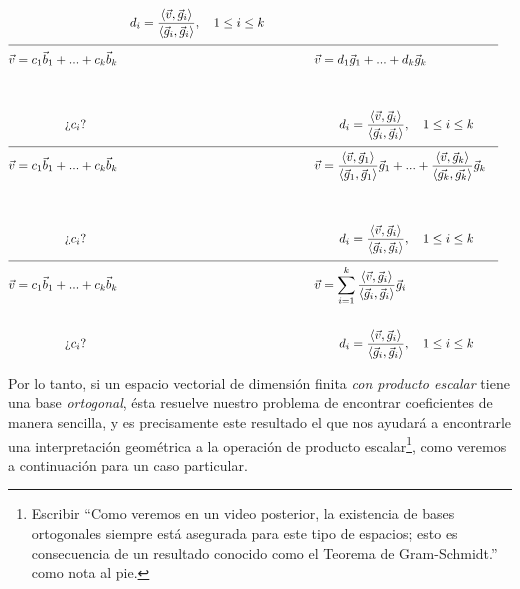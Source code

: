 \documentclass[12pt,dvipsnames]{article}
\numberwithin{equation}{section}
\begin{document}
\begin{align*}
    & &d_i = \frac{\langle \vec{v} ,\vec{g}_i \rangle}{\langle\vec{g}_i, \vec{g}_i\rangle}, \quad 1\le i\le k
    \\
    \cline{1-8}
    \vec{v}&= c_1\vec{b}_1 + ... + c_k\vec{b}_k& &\quad \quad \quad \quad \vec{v}= d_1\vec{g}_1 + ... + d_k\vec{g}_k& & & \\
    \\
    \\
           &\quad \quad \quad \quad \text{¿}c_i\text{?}& &\quad \quad \quad \quad \quad \quad d_i = \frac{\langle \vec{v} ,\vec{g}_i \rangle}{\langle\vec{g}_i, \vec{g}_i\rangle}, \quad 1\le i\le k& & &
    \\
    \cline{1-8}
    \vec{v}&= c_1\vec{b}_1 + ... + c_k\vec{b}_k& &\quad \quad \quad \quad \vec{v}= \frac{\langle \vec{v} , \vec{g}_1 \rangle}{\langle \vec{g}_1 , \vec{g}_1 \rangle}\vec{g}_1 + ... + \frac{\langle \vec{v} , \vec{g}_k \rangle}{\langle \vec{g_k} , \vec{g_k} \rangle}\vec{g}_k& & & \\
    \\
    \\
           &\quad \quad \quad \quad \text{¿}c_i\text{?}& &\quad \quad \quad \quad \quad \quad d_i = \frac{\langle \vec{v} ,\vec{g}_i \rangle}{\langle\vec{g}_i, \vec{g}_i\rangle}, \quad 1\le i\le k& & &
    \\
    \cline{1-8}
    \vec{v}&= c_1\vec{b}_1 + ... + c_k\vec{b}_k& &\quad \quad \quad \quad \vec{v}= \sum_{i=1}^k\frac{\langle \vec{v} , \vec{g}_i \rangle}{\langle \vec{g}_i , \vec{g}_i \rangle}\vec{g}_i & & &
    \\
    \\
           &\quad \quad \quad \quad \text{¿}c_i\text{?}& &\quad \quad \quad \quad \quad \quad d_i = \frac{\langle \vec{v} ,\vec{g}_i \rangle}{\langle\vec{g}_i, \vec{g}_i\rangle}, \quad 1\le i\le k& & &
\end{align*}

Por lo tanto, si un espacio vectorial de dimensión finita \emph{con producto escalar} tiene una base \emph{ortogonal}, ésta resuelve nuestro problema de encontrar coeficientes de manera sencilla, y es precisamente este resultado el que nos ayudará a encontrarle una interpretación geométrica a la operación de producto escalar\footnote{Escribir ``Como veremos en un video posterior, la existencia de bases ortogonales siempre está asegurada para este tipo de espacios; esto es consecuencia de un resultado conocido como el Teorema de Gram-Schmidt.'' como nota al pie.}, como veremos a continuación para un caso particular.
\end{document}

